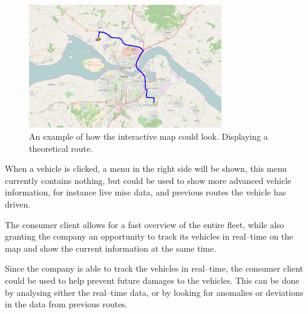 \bigskip
\begin{figure}[h]
    \centering
    \includegraphics[width=0.75\textwidth]{img/ConsumerClientMap.png}
    \caption{An example of how the interactive map could look. Displaying a theoretical route.}
    \label{fig:ConsumerClientMap}
\end{figure}
When a vehicle is clicked, a menu in the right side will be shown, this menu currently contains nothing, but could be used to show more advanced vehicle information, for instance live misc data, and previous routes the vehicle has driven.

\bigskip
The consumer client allows for a fast overview of the entire fleet, while also granting the company an opportunity to track its vehicles in real--time on the map and show the current information at the same time.

Since the company is able to track the vehicles in real--time, the consumer client could be used to help prevent future damages to the vehicles.
This can be done by analysing either the real--time data, or by looking for anomalies or deviations in the data from previous routes.

